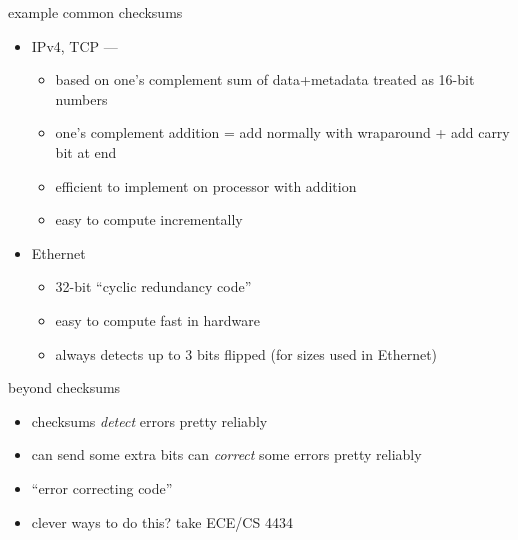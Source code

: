 \begin{frame}[fragile]{example common checksums}
\begin{itemize}
\item IPv4, TCP ---
    \begin{itemize}
    \item based on one's complement sum of data+metadata treated as 16-bit numbers
    \item one's complement addition = add normally with wraparound + add carry bit at end
    \item efficient to implement on processor with addition
    \item easy to compute incrementally
    \end{itemize}
\item Ethernet
    \begin{itemize}
    \item 32-bit ``cyclic redundancy code''
    \item easy to compute fast in hardware
    \item always detects up to 3 bits flipped (for sizes used in Ethernet)
    \end{itemize}
\end{itemize}
\end{frame}

\begin{frame}{beyond checksums}
    \begin{itemize}
    \item checksums \textit{detect} errors pretty reliably
    \vspace{.5cm}
    \item can send some extra bits can \textit{correct} some errors pretty reliably
    \item ``error correcting code''
    \vspace{.5cm}
    \item clever ways to do this? take ECE/CS 4434
    \end{itemize}
\end{frame}
